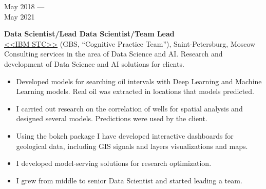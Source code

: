 \documentclass[10pt,a4paper]{article}
\newcommand{\lmpratio}{0.15}
\newcommand{\rmpratio}{0.74}
\newcommand{\vSpace}{0.5cm}
\newcommand{\horizontalSpace}{0.05\textwidth}
\newcommand{\sectionMain}[1]{\textbf{#1}}
\begin{document}
	\begin{minipage}[t]{\lmpratio\textwidth}
		May 2018 --- \\May 2021
	\end{minipage}
	\hspace{\horizontalSpace}
	\begin{minipage}[t]{\rmpratio\textwidth}
		\sectionMain{Data Scientist/Lead Data Scientist/Team Lead}\\
		\href{https://www.ibm.com/ru/rstl/index-en.html}{<<IBM STC>>} (GBS, ``Cognitive Practice Team''), Saint-Petersburg, Moscow\\[0.1cm]
  
Consulting services in the area of Data Science and AI.
Research and development of Data Science and AI solutions for clients.
  
		\begin{itemize}
                \item 
Developed models for searching oil intervals with Deep Learning and Machine Learning models.
Real oil was extracted in locations that models predicted.
                \item 
I carried out research on the correlation of wells for spatial analysis and designed several models.
Predictions were used by the client.
                \item
Using the bokeh package I have developed interactive dashboards for geological data, including GIS signals and layers visualizations and maps.
                \item
I developed model-serving solutions for research optimization.
                \item
I grew from middle to senior Data Scientist and started leading a team.
            \end{itemize}
		
	\end{minipage}	
	\vspace{\vSpace}
	
\end{document}
